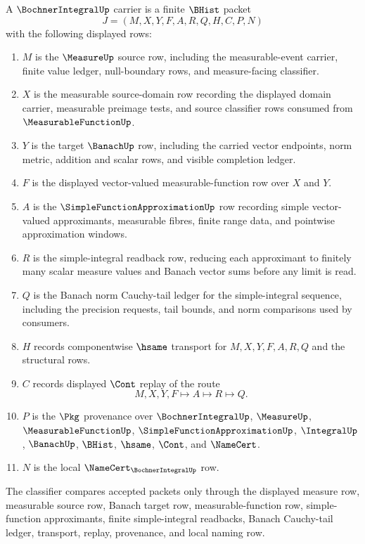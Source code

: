 \begin{definition}
\label{def:bochner-integral-carrier}
A $\BochnerIntegralUp$ carrier is a finite $\BHist$ packet
$$
J=(M,X,Y,F,A,R,Q,H,C,P,N)
$$
with the following displayed rows:
\begin{enumerate}
\item $M$ is the $\MeasureUp$ source row, including the measurable-event carrier, finite value ledger, null-boundary rows, and measure-facing classifier.
\item $X$ is the measurable source-domain row recording the displayed domain carrier, measurable preimage tests, and source classifier rows consumed from $\MeasurableFunctionUp$.
\item $Y$ is the target $\BanachUp$ row, including the carried vector endpoints, norm metric, addition and scalar rows, and visible completion ledger.
\item $F$ is the displayed vector-valued measurable-function row over $X$ and $Y$.
\item $A$ is the $\SimpleFunctionApproximationUp$ row recording simple vector-valued approximants, measurable fibres, finite range data, and pointwise approximation windows.
\item $R$ is the simple-integral readback row, reducing each approximant to finitely many scalar measure values and Banach vector sums before any limit is read.
\item $Q$ is the Banach norm Cauchy-tail ledger for the simple-integral sequence, including the precision requests, tail bounds, and norm comparisons used by consumers.
\item $H$ records componentwise $\hsame$ transport for $M,X,Y,F,A,R,Q$ and the structural rows.
\item $C$ records displayed $\Cont$ replay of the route
$$
M,X,Y,F\longmapsto A\longmapsto R\longmapsto Q .
$$
\item $P$ is the $\Pkg$ provenance over $\BochnerIntegralUp$, $\MeasureUp$, $\MeasurableFunctionUp$, $\SimpleFunctionApproximationUp$, $\IntegralUp$, $\BanachUp$, $\BHist$, $\hsame$, $\Cont$, and $\NameCert$.
\item $N$ is the local $\NameCert_{\BochnerIntegralUp}$ row.
\end{enumerate}
The classifier compares accepted packets only through the displayed measure row, measurable source row, Banach target row, measurable-function row, simple-function approximants, finite simple-integral readbacks, Banach Cauchy-tail ledger, transport, replay, provenance, and local naming row.
\end{definition}

